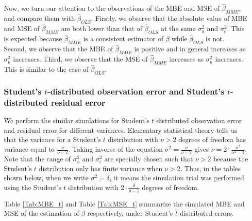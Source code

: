 \documentclass{article}
\begin{document}
Now, we turn our attention to the observations of the MBE and MSE of $\hat{\beta}_{MME}$, and compare them with $\hat{\beta}_{OLS}$.
Firstly, we observe that the absolute value of MBE and MSE of $\hat{\beta}_{MME}$ are both lower than that of $\hat{\beta}_{OLS}$ at the same $\sigma^2_u$ and $\sigma^2_\epsilon$.
This is expected because $\hat{\beta}_{MME}$ is a consistent estimator of $\beta$ while $\hat{\beta}_{OLS}$ is not.
Second, we observe that the MBE of $\hat{\beta}_{MME}$ is positive and in general increases as $\sigma^2_u$ increases.
Third, we observe that the MSE of $\hat{\beta}_{MME}$ increases as $\sigma^2_u$ increases. This is similar to the case of $\hat{\beta}_{OLS}$.

\subsubsection{Student's $t$-distributed observation error and Student's $t$-distributed residual error}

We perform the similar simulations for Student's $t$ distributed observation error and residual error for different variances.
Elementary statistical theory tells us that the variance for a Student's $t$ distribution with $\nu > 2$ degrees of freedom has variance equal to $\frac{\nu}{\nu-2}$.
Taking inverse of the equation $\sigma^2 = \frac{\nu}{\nu-2}$ gives $\nu = 2 \cdot \frac{\sigma^2}{\sigma^2-1}$.
Note that the range of $\sigma^2_u$ and $\sigma^2_\epsilon$ are specially chosen such that $\nu > 2$ because the Student's $t$ distribution only has finite variance when $\nu > 2$.
Thus, in the tables shown below, when we write $\sigma^2 = \delta$, it means the simulation trial was performed using the Student's $t$ distribution with $2 \cdot \frac{\delta}{\delta-1}$ degrees of freedom.

Table \ref{Tab:MBE_t} and Table \ref{Tab:MSE_t} summarize the simulated MBE and MSE of the estimation of $\beta$ respectively, under Student's $t$-distributed errors.
\end{document}
